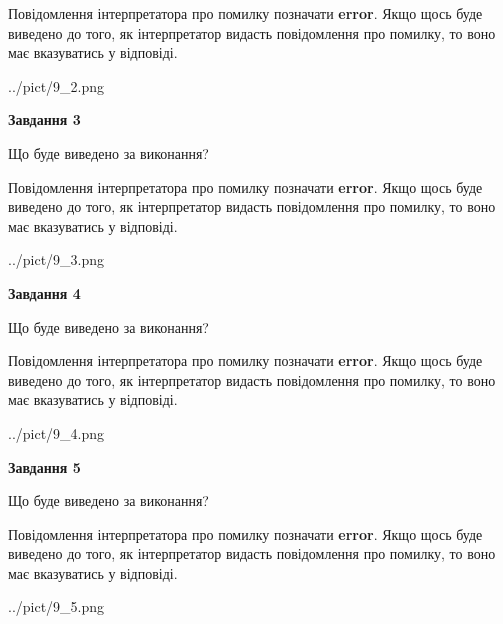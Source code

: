 \documentclass[12pt, ukrainian]{article}
\begin{document}
{\begin {large}
Повідомлення інтерпретатора про помилку позначати \textbf{error}.
Якщо щось буде виведено до того, як інтерпретатор видасть повідомлення про помилку, 
то воно має вказуватись у відповіді. \par


\begin{center}
	{../pict/9_2.png}
\end{center}
\newpage

{\begin {center}\textbf{Завдання 3}\end {center}}\par
Що буде виведено за виконання?

Повідомлення інтерпретатора про помилку позначати \textbf{error}.
Якщо щось буде виведено до того, як інтерпретатор видасть повідомлення про помилку, 
то воно має вказуватись у відповіді. \par


\begin{center}
	{../pict/9_3.png}
\end{center}
\newpage

{\begin {center}\textbf{Завдання 4}\end {center}}\par
Що буде виведено за виконання?

Повідомлення інтерпретатора про помилку позначати \textbf{error}.
Якщо щось буде виведено до того, як інтерпретатор видасть повідомлення про помилку, 
то воно має вказуватись у відповіді. \par


\begin{center}
	{../pict/9_4.png}
\end{center}
\newpage

{\begin {center}\textbf{Завдання 5}\end {center}}\par
Що буде виведено за виконання?

Повідомлення інтерпретатора про помилку позначати \textbf{error}.
Якщо щось буде виведено до того, як інтерпретатор видасть повідомлення про помилку, 
то воно має вказуватись у відповіді. \par


\begin{center}
	{../pict/9_5.png}
\end{center}
\newpage


\end{large}}
\end{document}

